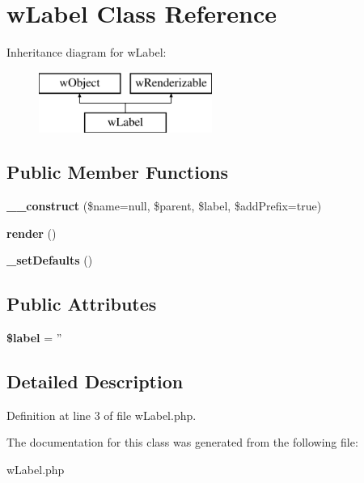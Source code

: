 \hypertarget{classwLabel}{
\section{wLabel Class Reference}
\label{classwLabel}
}
Inheritance diagram for wLabel:\begin{figure}[H]
\begin{center}
\leavevmode
\includegraphics[height=2.000000cm]{classwLabel}
\end{center}
\end{figure}
\subsection*{Public Member Functions}
\begin{DoxyCompactItemize}
\item 
\hypertarget{classwLabel_a9cfc72c52cd114f7a6c2f8cbf3342ea1}{
{\bfseries \_\-\_\-construct} (\$name=null, \$parent, \$label, \$addPrefix=true)}
\label{classwLabel_a9cfc72c52cd114f7a6c2f8cbf3342ea1}

\item 
\hypertarget{classwLabel_a4af583bea5a3d8bbbd5c29e48b03a092}{
{\bfseries render} ()}
\label{classwLabel_a4af583bea5a3d8bbbd5c29e48b03a092}

\item 
\hypertarget{classwLabel_aeaece3629b7f812f32388e87b451cf82}{
{\bfseries \_\-setDefaults} ()}
\label{classwLabel_aeaece3629b7f812f32388e87b451cf82}

\end{DoxyCompactItemize}
\subsection*{Public Attributes}
\begin{DoxyCompactItemize}
\item 
\hypertarget{classwLabel_af2ea881445d2810ecd329cfe3622117c}{
{\bfseries \$label} = ''}
\label{classwLabel_af2ea881445d2810ecd329cfe3622117c}

\end{DoxyCompactItemize}


\subsection{Detailed Description}


Definition at line 3 of file wLabel.php.



The documentation for this class was generated from the following file:\begin{DoxyCompactItemize}
\item 
wLabel.php\end{DoxyCompactItemize}
